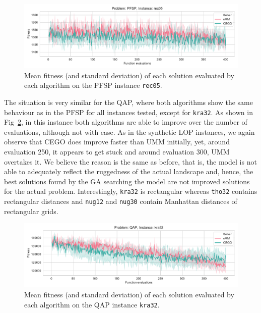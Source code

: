 \documentclass[runningheads]{llncs}
\begin{document}
\begin{figure}[tb]
  \centering%
  \includegraphics[width=\textwidth]{img/fitness_real_pfsp_rec05_txt}
  \caption{Mean fitness  (and standard deviation)  of each solution evaluated by each algorithm on the PFSP instance \texttt{rec05}.\label{fig:rec05}}
\end{figure}

The situation is very similar for the QAP, where both algorithms show the same
behaviour as in the PFSP for all instances tested, except for
\texttt{kra32}. As shown in Fig~\ref{fig:kra32}, in this instance both
algorithms are able to improve over the number of evaluations, although not
with ease. As in the synthetic LOP instances, we again observe that CEGO does
improve faster than UMM initially, yet, around evaluation 250, it appears to
get stuck and around evaluation 300, UMM overtakes it. We believe the reason is
the same as before, that is, the model is not able to adequately reflect the
ruggedness of the actual landscape and, hence, the best solutions found by the
GA searching the model are not improved solutions for the actual problem. Interestingly, \texttt{kra32} is rectangular
whereas \texttt{tho32} contains rectangular distances and \texttt{nug12} and \texttt{nug30} contain Manhattan distances of rectangular grids.

\begin{figure}
  \centering%
  \includegraphics[width=\textwidth]{img/fitness_real_qap_kra32_dat}
    \caption{Mean fitness  (and standard deviation)  of each solution evaluated by each algorithm on the QAP instance \texttt{kra32}.\label{fig:kra32}}
\end{figure}
\end{document}
